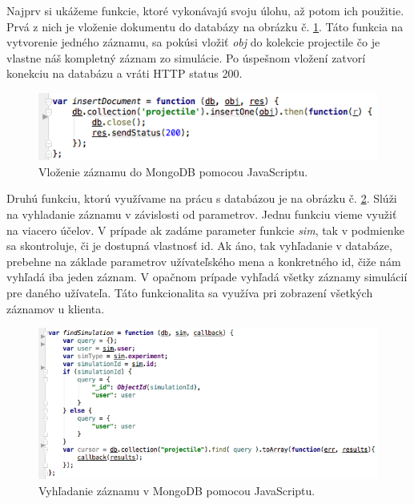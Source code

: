 Najprv si ukážeme funkcie, ktoré vykonávajú svoju úlohu, až potom ich použitie. Prvá z nich je vloženie dokumentu do databázy na obrázku č. \ref{img-express-mongo-insert}. Táto funkcia na vytvorenie jedného záznamu, sa pokúsi vložiť \textit{obj} do kolekcie projectile čo je vlastne náš kompletný záznam zo simulácie. Po úspešnom vložení zatvorí konekciu na databázu a vráti HTTP status 200.

\begin{figure}[H]
  \centering
  \includegraphics[scale=0.7]{img/code/express-mongo-insert.png}
  \caption{Vloženie záznamu do MongoDB pomocou JavaScriptu.}
  \label{img-express-mongo-insert}
\end{figure}

Druhú funkciu, ktorú využívame na prácu s databázou je na obrázku č. \ref{img-express-mongodb-find}. Slúži na vyhladanie záznamu v závislosti od parametrov. Jednu funkciu vieme využiť na viacero účelov. V prípade ak zadáme parameter funkcie \textit{sim}, tak v podmienke sa skontroluje, či je dostupná vlastnosť id. Ak áno, tak vyhľadanie v databáze, prebehne na základe parametrov užívateľského mena a konkretného id, čiže nám vyhľadá iba jeden záznam. V opačnom prípade vyhľadá všetky záznamy simulácií pre daného užívateľa. Táto funkcionalita sa využíva pri zobrazení všetkých záznamov u klienta.

\begin{figure}[H]
  \centering
  \includegraphics[scale=0.7]{img/code/express-mongodb-find.png}
  \caption{Vyhľadanie záznamu v MongoDB pomocou JavaScriptu.}
  \label{img-express-mongodb-find}
\end{figure}

